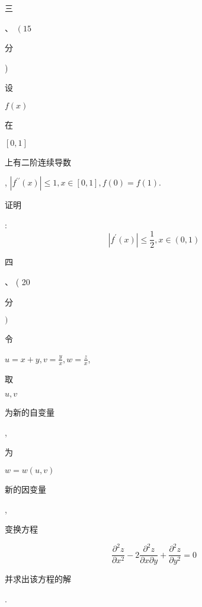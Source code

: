 \documentclass[10pt]{article}
\begin{document}
\begin{CJK}{UTF8}{mj}三\end{CJK}、 $\left(15\right.$ \begin{CJK}{UTF8}{mj}分\end{CJK}) \begin{CJK}{UTF8}{mj}设\end{CJK} $f(x)$ \begin{CJK}{UTF8}{mj}在\end{CJK} $[0,1]$ \begin{CJK}{UTF8}{mj}上有二阶连续导数\end{CJK}, $\left|f^{\prime \prime}(x)\right| \leqslant 1, x \in[0,1], f(0)=f(1)$. \begin{CJK}{UTF8}{mj}证明\end{CJK}:
$$
\left|f^{\prime}(x)\right| \leqslant \frac{1}{2}, x \in(0,1)
$$
\begin{CJK}{UTF8}{mj}四\end{CJK}、 ( 20 \begin{CJK}{UTF8}{mj}分\end{CJK} $)$ \begin{CJK}{UTF8}{mj}令\end{CJK} $u=x+y, v=\frac{y}{x}, w=\frac{z}{x}$, \begin{CJK}{UTF8}{mj}取\end{CJK} $u, v$ \begin{CJK}{UTF8}{mj}为新的自变量\end{CJK}, \begin{CJK}{UTF8}{mj}为\end{CJK} $w=w(u, v)$ \begin{CJK}{UTF8}{mj}新的因变量\end{CJK}, \begin{CJK}{UTF8}{mj}变换方程\end{CJK}
$$
\frac{\partial^{2} z}{\partial x^{2}}-2 \frac{\partial^{2} z}{\partial x \partial y}+\frac{\partial^{2} z}{\partial y^{2}}=0
$$
\begin{CJK}{UTF8}{mj}并求出该方程的解\end{CJK}.
\end{document}
